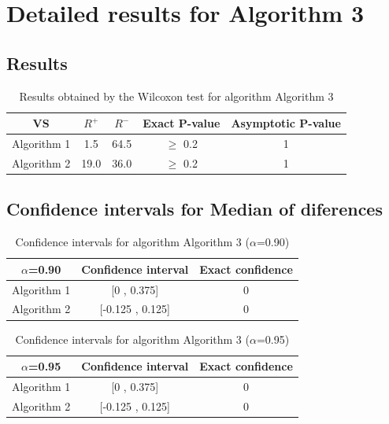 \documentclass[a4paper,10pt]{article}
\begin{document}
 \clearpage 


\section{Detailed results for Algorithm 3}


\subsection{Results}

\begin{table}[!htp]
\centering\small
\begin{tabular}{
|c|c|c|c|c|}
\hline
 VS & $R^{+}$ & $R^{-}$ & Exact P-value & Asymptotic P-value \\ \hline 
Algorithm 1 & 1.5 & 64.5 & $\geq$ 0.2 & 1\\ \hline 
Algorithm 2 & 19.0 & 36.0 & $\geq$ 0.2 & 1\\ \hline 

\end{tabular}
\caption{Results obtained by the Wilcoxon test for algorithm Algorithm 3}
\end{table}

\subsection{Confidence intervals for Median of diferences}

\begin{table}[!htp]
\centering\small
\begin{tabular}{
|c|c|c|}
\hline
 $\alpha$=0.90 & Confidence interval & Exact confidence \\ \hline 
Algorithm 1 & [0 , 0.375] & 0\\ \hline 
Algorithm 2 & [-0.125 , 0.125] & 0\\ \hline 

\end{tabular}
\caption{Confidence intervals for algorithm Algorithm 3 ($\alpha$=0.90)}
\end{table}
\begin{table}[!htp]
\centering\small
\begin{tabular}{
|c|c|c|}
\hline
 $\alpha$=0.95 & Confidence interval & Exact confidence \\ \hline 
Algorithm 1 & [0 , 0.375] & 0\\ \hline 
Algorithm 2 & [-0.125 , 0.125] & 0\\ \hline 

\end{tabular}
\caption{Confidence intervals for algorithm Algorithm 3 ($\alpha$=0.95)}
\end{table}

 \clearpage 
\end{document}

